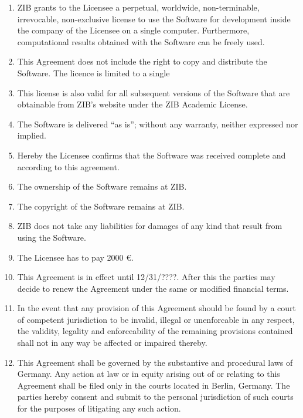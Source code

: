 \documentclass[12pt,a4paper]{article}
\begin{document}
\begin{enumerate}
\item ZIB grants to the Licensee a perpetual, worldwide, non-terminable,
  irrevocable, non-exclusive license to use the Software for development
  inside the company of the Licensee on a single computer. Furthermore,
  computational results obtained with the Software can be freely used.

\item This Agreement does not include the right to copy and distribute the
  Software. The licence is limited to a single 

\item This license is also valid for all subsequent versions of the
  Software that are obtainable from ZIB's website under the
  ZIB Academic License.

\item The Software is delivered ``as is'';
   without any warranty, neither expressed nor implied.

\item Hereby the Licensee confirms that the Software was received
  complete and according to this agreement.

\item The ownership of the Software remains at ZIB.

\item The copyright of the Software remains at ZIB.

\item ZIB does not take any liabilities for damages of any kind that
  result from using the Software.

\item The Licensee has to pay 2000 \euro{}.

\item This Agreement is in effect until 12/31/????. After this the parties
  may decide to renew the Agreement under the same or modified financial
  terms.

\item In the event that any provision of this Agreement should be
  found by a court of competent jurisdiction to be invalid, illegal or
  unenforcable in any respect, the validity, legality and
  enforceability of the remaining provisions contained shall not in
  any way be affected or impaired thereby.

\item This Agreement shall be governed by the substantive and
  procedural laws of Germany. Any action at law or in equity arising
  out of or relating to this Agreement shall be filed only in the
  courts located in Berlin, Germany. The parties hereby consent and
  submit to the personal jurisdiction of such courts for the purposes
  of litigating any such action.

\end{enumerate}
\end{document}
